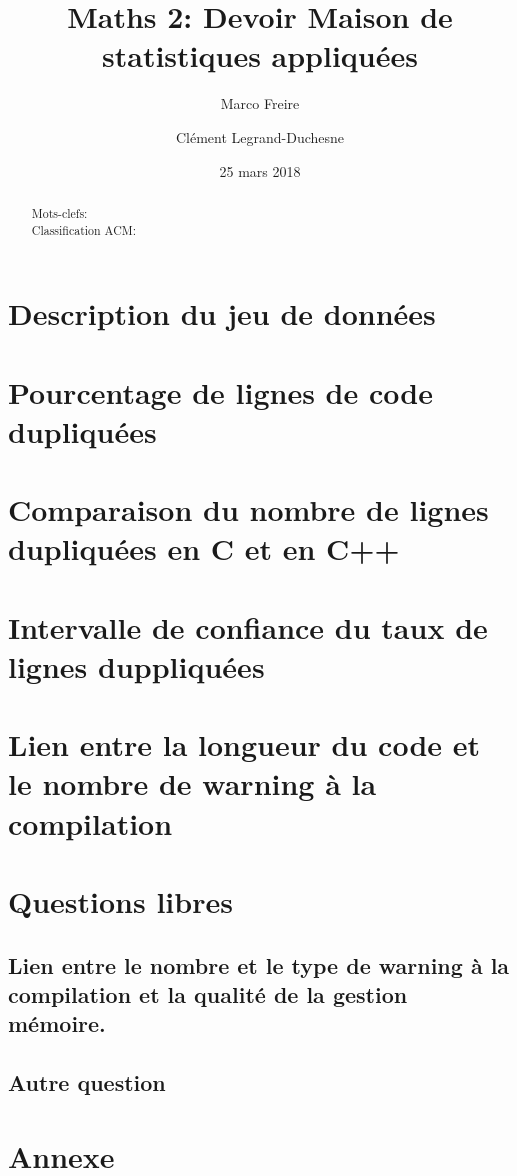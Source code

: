 \documentclass[a4paper,11pt]{article}%
\begin{document}
\title{Maths 2: Devoir Maison de statistiques appliquées}

\author{Marco Freire \and Clément Legrand-Duchesne}

\date{25 mars 2018}

\maketitle

\begin{abstract}
  
  \begin{description}
    
  \item[Mots-clefs:] 
      
  \item[Classification ACM:] 
  \end{description}
\end{abstract}

\renewcommand{\contentsname}{Plan}
\tableofcontents
\clearpage

\section{Description du jeu de données}


\section{Pourcentage de lignes de code dupliquées}


\section{Comparaison du nombre de lignes dupliquées en C et en C++}


\section{Intervalle de confiance du taux de lignes duppliquées}


\section{Lien entre la longueur du code et le nombre de warning à la
  compilation}


\section{Questions libres}
\subsection{Lien entre le nombre et le type de warning à la
  compilation et la qualité de la gestion mémoire.}

\subsection{Autre question}


\clearpage
\section*{Annexe}

\end{document}
